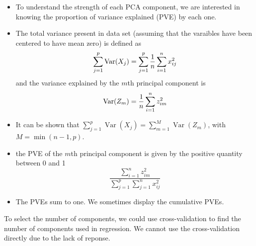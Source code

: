 \documentclass[11pt, a4paper]{article}
\begin{document}
\begin{itemize}
  \item To understand the strength of each PCA component, we are interested in knowing the proportion of variance explained (PVE) by each one.
  \item The total variance present in data set (assuming that the varaibles have been centered to have mean zero) is defined as
\[
  \sum_{j=1}^p\operatorname{Var}(X_j)=\sum_{j=1}^p{1\over n}\sum_{i=1}^n x^2_{ij}    
\]
and the variance explained by the $m$th principal component is 
\[
  \operatorname{Var}(Z_m)={1\over n}\sum_{i=1}^n z_{im}^2
\]
\item It can be shown that $\sum_{j=1}^p\operatorname{Var}(X_j)=\sum_{m=1}^M\operatorname{Var}(Z_m)$, with $M=\min(n-1,p)$.
\item the PVE of the $m$th principal component is given by the positive quantity between 0 and 1
\[
  \frac{\sum_{i=1}^n z_{im}^2}{\sum_{j=1}^p\sum_{j=1}^n x_{ij}^2} 
\]
\item The PVEs sum to one. We sometimes display the cumulative PVEs.
\end{itemize}
To select the number of components, we could use cross-validation to find the number of components used in regression. We cannot use the cross-validation directly due to the lack of reponse.
\end{document}
